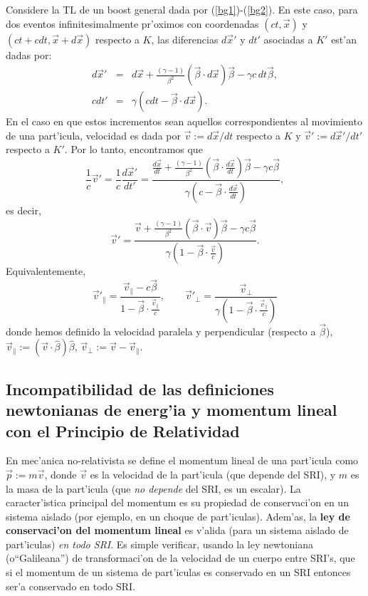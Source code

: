 Considere la TL de un boost general dada por (\ref{bg1})-(\ref{bg2}). En este
caso, para dos eventos infinitesimalmente pr'oximos con coordenadas
$(ct,\vec{x})$ y $(ct+cdt,\vec{x}+d\vec{x})$ respecto a $K$, las diferencias
$d\vec{x}'$ y $dt'$ asociadas a $K'$ est'an dadas por:
\begin{eqnarray}
d\vec{x}'  &  =&d\vec{x}+\frac{\left(  \gamma-1\right)  }{\beta^2}\left(  \vec{\beta}\cdot d\vec{x}\right)  \vec{\beta}-\gamma
c\,dt\vec{\beta},\\
cdt'  &  =&\gamma\left( cdt-\vec{\beta}\cdot d\vec{x}\right)  .
\end{eqnarray}
En el caso en que estos incrementos sean aquellos correspondientes al movimiento
de una part'icula, velocidad es dada por
$\vec{v}:={d\vec{x}}/{dt}$ respecto a $K$ y
$\vec{v}':={d\vec{x}'}/{dt'}$ respecto a $K'$. Por lo tanto, encontramos que
\begin{equation}
\frac{1}{c}\vec{v}'=\frac{1}{c}\frac{d\vec{x}'}{dt'}=\frac{\frac{d\vec{x}}{dt}
+\frac{\left(  \gamma-1\right)  }{\beta^2}\left(  \vec{\beta}\cdot
\frac{d\vec{x}}{dt}\right)  \vec{\beta}-\gamma c\vec{\beta}}{\gamma\left(
c-\vec{\beta}\cdot \frac{d\vec{x}}{dt}\right) },
\end{equation}
es decir,
\begin{equation}
\boxed{
\vec{v}'=\frac{\vec{v}+\frac{\left(  \gamma-1\right)  }{\beta^2}\left(
\vec{\beta}\cdot \vec{v}\right)  \vec{\beta}-\gamma c\vec{\beta}}{\gamma\left(
1-\vec{\beta}\cdot \frac{\vec{v}}{c}\right) }.
} \label{transv}
\end{equation}
Equivalentemente,
\begin{equation}
\vec{v}'_\parallel=\frac{\vec{v}_\parallel- c\vec{\beta}}{1-\vec{\beta}\cdot\frac{\vec{v}_\parallel}{c} }, \qquad 
\vec{v}'_\perp=\frac{\vec{v}_\perp}{\gamma\left(
1-\vec{\beta}\cdot \frac{\vec{v}_\parallel}{c}\right) }
\end{equation}
donde hemos definido la velocidad paralela y perpendicular (respecto a $\vec\beta$), $\vec{v}_\parallel:=(\vec{v}\cdot \hat\beta)\hat\beta$,  $\vec{v}_\perp:=\vec{v}-\vec{v}_\parallel$.

\subsection{Incompatibilidad de las definiciones newtonianas de energ'ia y momentum lineal con el Principio de Relatividad}

En mec'anica no-relativista se define el momentum lineal de una part'icula como
$\vec{p}:=m\vec{v}$, donde $\vec{v}$ es la velocidad de la part'icula (que
depende del SRI), y $m$ es la masa de la part'icula (que \textit{no depende} del SRI, es un escalar). La caracter'istica principal del momentum es su propiedad de conservaci'on en un sistema aislado (por ejemplo, en un choque de part'iculas). Adem'as, la \textbf{ley de conservaci'on del momentum lineal} es v'alida (para un sistema aislado de part'iculas) \textit{en todo SRI}. Es simple verificar, usando la ley newtoniana (o``Galileana'') de  transformaci'on de la velocidad de un cuerpo entre SRI's, que si el momentum de un sistema de part'iculas es conservado en un SRI entonces ser'a conservado en todo SRI. 


